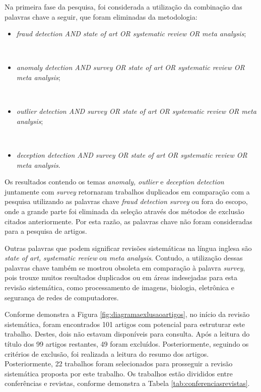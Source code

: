 \documentclass[smallextended]{svjour3}
\begin{document}
Na primeira fase da pesquisa, foi considerada a utilização da combinação das palavras chave a seguir, que foram eliminadas da metodologia:

\begin{itemize}
	\item \emph{fraud detection AND state of art OR systematic review OR meta analysis};
	
	\
	\item \emph{anomaly detection AND survey OR state of art OR systematic review OR meta analysis};
	
	\
	\item \emph{outlier detection AND survey OR state of art OR systematic review OR meta analysis}; 	
	
	\
	\item \emph{deception detection AND survey OR state of art OR systematic review OR meta analysis}.
\end{itemize}

Os resultados contendo os temas \emph{anomaly, outlier} e \emph{deception detection} juntamente com \emph{survey} retornaram trabalhos duplicados em comparação com a pesquisa utilizando as palavras chave \emph{fraud detection survey} ou fora do escopo, onde a grande parte foi eliminada da seleção através dos métodos de exclusão citados anteriormente. Por esta razão, as palavras chave não foram consideradas para a pesquisa de artigos.

Outras palavras que podem significar revisões sistemáticas na língua inglesa são \emph{state of art, systematic review} ou \emph{meta analysis}. Contudo, a utilização dessas palavras chave também se mostrou obsoleta em comparação à palavra \emph{survey}, pois trouxe muitos resultados duplicados ou em áreas indesejadas para esta revisão sistemática, como processamento de imagens, biologia, eletrônica e segurança de redes de computadores.

Conforme demonstra a Figura \ref{fig:diagramaexlusaoartigos}, no início da revisão sistemática, foram encontrados 101 artigos com potencial para estruturar este trabalho. Destes, dois não estavam disponíveis para consulta. Após a leitura do título dos 99 artigos restantes, 49 foram excluídos. Posteriormente, seguindo os critérios de exclusão, foi realizada a leitura do resumo dos artigos. Posteriormente, 22 trabalhos foram selecionados para prosseguir a revisão sistemática proposta por este trabalho. Os trabalhos estão divididos entre conferências e revistas, conforme demonstra a Tabela \ref{tab:conferenciasrevistas}.
\end{document}
